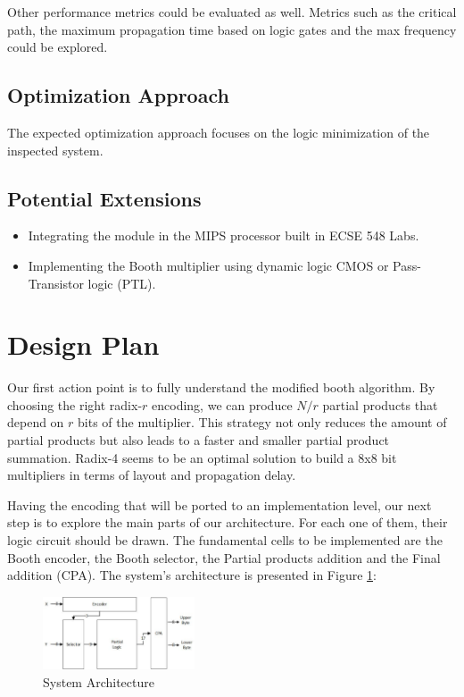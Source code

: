 \documentclass[conference]{IEEEtran}
\begin{document}
Other performance metrics could be evaluated as well. 
Metrics such as the critical path, the maximum propagation time 
based on logic gates and the max frequency could be 
explored. 


\subsection{Optimization Approach}

The expected optimization approach focuses
on the logic minimization of the inspected 
system. 


\subsection{Potential Extensions}


\begin{itemize}
\item Integrating the module in the MIPS processor built in ECSE 548 Labs.
\item Implementing the Booth multiplier using dynamic logic 
CMOS or Pass-Transistor logic (PTL).
\end{itemize}



\section{Design Plan}

Our first action point is to fully 
understand the modified booth algorithm.
By choosing the right 
radix-$r$ encoding, we can produce $N/r$ 
partial products that depend on $r$ bits 
of the multiplier. This strategy not only 
reduces the amount of partial products 
but also leads to a faster and smaller 
partial product summation. Radix-4 seems to 
be an optimal solution to build a 8x8 bit 
multipliers in terms of layout and propagation delay.


Having the encoding that will be ported to 
an implementation level, our next step is
to explore the main parts of our architecture.
For each one of them, their logic circuit should 
be drawn. The fundamental cells to be implemented are the 
Booth encoder, the Booth selector, the Partial products 
addition and the Final addition (CPA).
The system's architecture is presented in Figure \ref{fig:draw}: 
\begin{figure}[h!]
  \centering
  \includegraphics[width=0.4\textwidth]{draw.pdf}
  \centering
  \caption{System Architecture}
  \label{fig:draw}
\end{figure}
\end{document}
